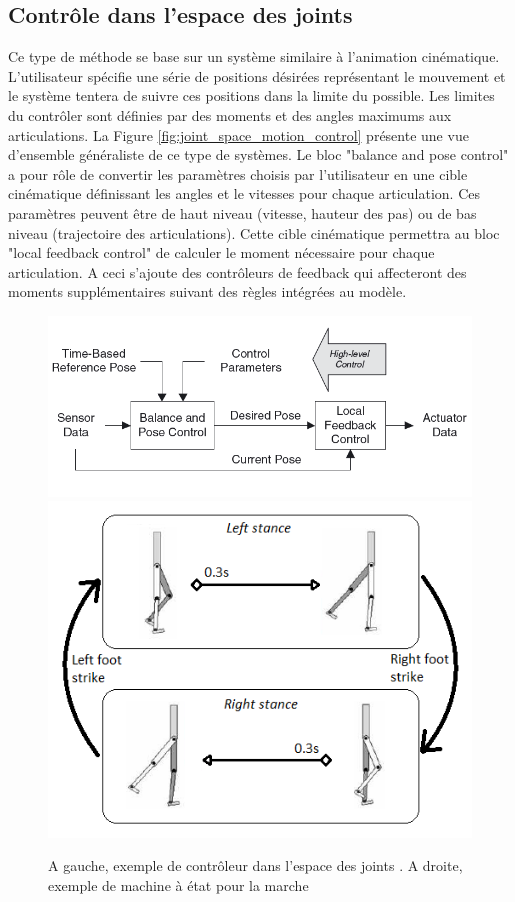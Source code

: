 \documentclass{llncs}
\begin{document}
\subsection{Contrôle dans l'espace des joints} 
Ce type de méthode se base sur un système similaire à l'animation cinématique. L'utilisateur spécifie une série de positions désirées représentant le mouvement et le système tentera de suivre ces positions dans la limite du possible. Les limites du contrôler sont définies par des moments et des angles maximums aux articulations. La Figure \ref{fig:joint_space_motion_control} présente une vue d'ensemble généraliste de ce type de systèmes. Le bloc "balance and pose control" a pour rôle de convertir les paramètres choisis par l'utilisateur en une cible cinématique définissant les angles et le vitesses pour chaque articulation. Ces paramètres peuvent être de haut niveau (vitesse, hauteur des pas) ou de bas niveau (trajectoire des articulations). Cette cible cinématique permettra au bloc "local feedback control" de calculer le moment nécessaire pour chaque articulation. A ceci s'ajoute des contrôleurs de feedback qui affecteront des moments supplémentaires suivant des règles intégrées au modèle. 
\begin{figure}[h]
\centering
\includegraphics[scale=0.4]{joint_space_motion_control.png}
\includegraphics[scale=0.5]{state_machine.png}
\caption{A gauche, exemple de contrôleur dans l'espace des joints \cite{geijtenbeek2012interactive}. A droite, exemple de machine à état pour la marche \cite{yin2007simbicon}}
\label{fig:joint_space_motion_control}
\label{fig:state_machine}
\end{figure}
\end{document}
